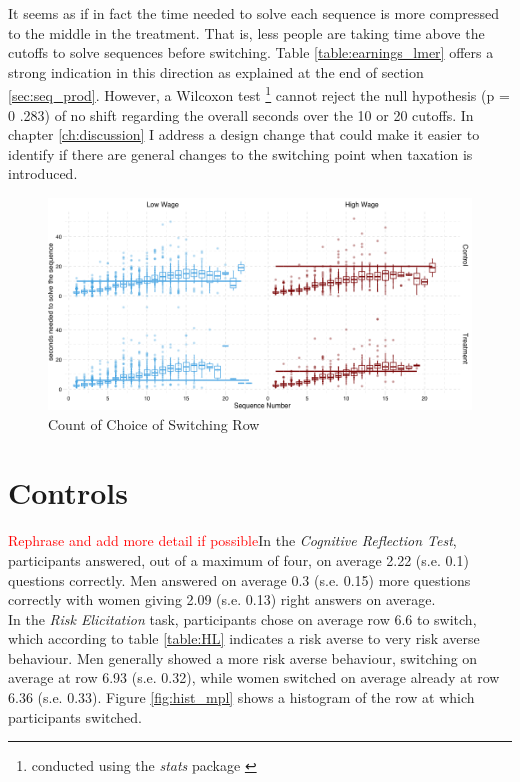 It seems as if in fact the time needed to solve each sequence is more compressed to the middle in the treatment. That is, less people are taking time above the cutoffs to solve sequences before switching. Table \ref{table:earnings_lmer} offers a strong indication in this direction as explained at the end of section \ref{sec:seq_prod}. However, a Wilcoxon test \footnote{conducted using the \textit{stats} package \cite{rcoreteam2014}} cannot reject the null hypothesis (p = 0 .283) of no shift regarding the overall seconds over the 10 or 20 cutoffs. In chapter \ref{ch:discussion} I address a design change that could make it easier to identify if there are general changes to the switching point when taxation is introduced.\\

\begin{figure}
    \centering
    \includegraphics[width=\textwidth]{graphs/time_task_grid.png}
    \caption{Count of Choice of Switching Row}
    \label{fig:time_per_task}
\end{figure}

\section{Controls}

\textcolor{red}{Rephrase and add more detail if possible}In the \textit{Cognitive Reflection Test}, participants answered, out of a maximum of four, on average 2.22 (s.e. 0.1) questions correctly. Men answered on average 0.3 (s.e. 0.15) more questions correctly with women giving 2.09 (s.e. 0.13) right answers on average.\\

In the \textit{Risk Elicitation} task, participants chose on average row 6.6 to switch, which according to table \ref{table:HL} indicates a risk averse to very risk averse behaviour. Men generally showed a more risk averse behaviour, switching on average at row 6.93 (s.e. 0.32), while women switched on average already at row 6.36 (s.e. 0.33). Figure \ref{fig:hist_mpl} shows a histogram of the row at which participants switched.\\

